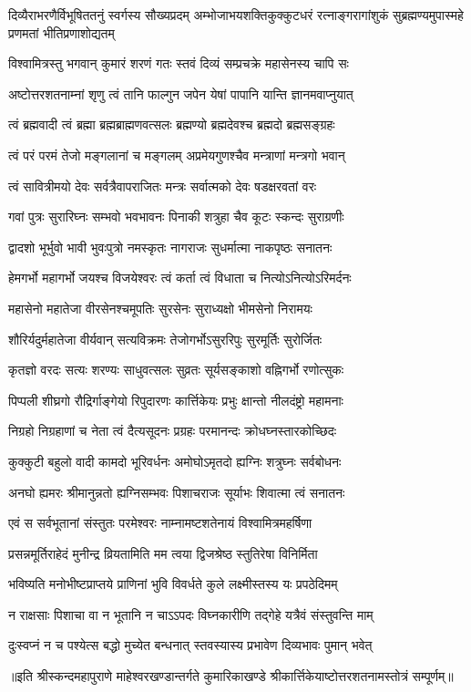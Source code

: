 
{दिव्यैराभरणैर्विभूषिततनुं स्वर्गस्य सौख्यप्रदम्}
{अम्भोजाभयशक्तिकुक्कुटधरं रत्नाङ्गरागांशुकं}
{सुब्रह्मण्यमुपास्महे प्रणमतां भीतिप्रणाशोद्यतम्}

\twolineshloka
{विश्वामित्रस्तु भगवान् कुमारं शरणं गतः}
{स्तवं दिव्यं सम्प्रचक्रे महासेनस्य चापि सः}

\twolineshloka
{अष्टोत्तरशतनाम्नां शृणु त्वं तानि फाल्गुन}
{जपेन येषां पापानि यान्ति ज्ञानमवाप्नुयात्}

\twolineshloka
{त्वं ब्रह्मवादी त्वं ब्रह्मा ब्रह्मब्राह्मणवत्सलः}
{ब्रह्मण्यो ब्रह्मदेवश्च ब्रह्मदो ब्रह्मसङ्ग्रहः}

\twolineshloka
{त्वं परं परमं तेजो मङ्गलानां च मङ्गलम्}
{अप्रमेयगुणश्चैव मन्त्राणां मन्त्रगो भवान्}

\twolineshloka
{त्वं सावित्रीमयो देवः सर्वत्रैवापराजितः}
{मन्त्रः सर्वात्मको देवः षडक्षरवतां वरः}

\twolineshloka
{गवां पुत्रः सुरारिघ्नः सम्भवो भवभावनः}
{पिनाकी शत्रुहा चैव कूटः स्कन्दः सुराग्रणीः}

\twolineshloka
{द्वादशो भूर्भुवो भावी भुवःपुत्रो नमस्कृतः}
{नागराजः सुधर्मात्मा नाकपृष्ठः सनातनः}

\twolineshloka
{हेमगर्भो महागर्भो जयश्च विजयेश्वरः}
{त्वं कर्ता त्वं विधाता च नित्योऽनित्योऽरिमर्दनः}

\twolineshloka
{महासेनो महातेजा वीरसेनश्चमूपतिः}
{सुरसेनः सुराध्यक्षो भीमसेनो निरामयः}

\twolineshloka
{शौरिर्यदुर्महातेजा वीर्यवान् सत्यविक्रमः}
{तेजोगर्भोऽसुररिपुः सुरमूर्तिः सुरोर्जितः}

\twolineshloka
{कृतज्ञो वरदः सत्यः शरण्यः साधुवत्सलः}
{सुव्रतः सूर्यसङ्काशो वह्निगर्भो रणोत्सुकः}

\twolineshloka
{पिप्पली शीघ्रगो रौद्रिर्गाङ्गेयो रिपुदारणः}
{कार्त्तिकेयः प्रभुः क्षान्तो नीलदंष्ट्रो महामनाः}

\twolineshloka
{निग्रहो निग्रहाणां च नेता त्वं दैत्यसूदनः}
{प्रग्रहः परमानन्दः क्रोधघ्नस्तारकोच्छिदः}

\twolineshloka
{कुक्कुटी बहुलो वादी कामदो भूरिवर्धनः}
{अमोघोऽमृतदो ह्यग्निः शत्रुघ्नः सर्वबोधनः}

\twolineshloka
{अनघो ह्यमरः श्रीमानुन्नतो ह्यग्निसम्भवः}
{पिशाचराजः सूर्याभः शिवात्मा त्वं सनातनः}

\twolineshloka
{एवं स सर्वभूतानां संस्तुतः परमेश्वरः}
{नाम्नामष्टशतेनायं विश्वामित्रमहर्षिणा}

\twolineshloka
{प्रसन्नमूर्तिराहेदं मुनीन्द्र व्रियतामिति}
{मम त्वया द्विजश्रेष्ठ स्तुतिरेषा विनिर्मिता}

\twolineshloka
{भविष्यति मनोभीष्टप्राप्तये प्राणिनां भुवि}
{विवर्धते कुले लक्ष्मीस्तस्य यः प्रपठेदिमम्}

\twolineshloka
{न राक्षसाः पिशाचा वा न भूतानि न चाऽऽपदः}
{विघ्नकारीणि तद्गेहे यत्रैवं संस्तुवन्ति माम्}

\twolineshloka
{दुःस्वप्नं न च पश्येत्स बद्धो मुच्येत बन्धनात्}
{स्तवस्यास्य प्रभावेण दिव्यभावः पुमान् भवेत्}

{॥इति श्रीस्कन्दमहापुराणे माहेश्वरखण्डान्तर्गते कुमारिकाखण्डे श्रीकार्त्तिकेयाष्टोत्तरशतनामस्तोत्रं सम्पूर्णम्॥}